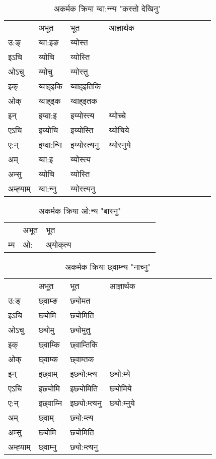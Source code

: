 \begin{table}[H]
\label{ot.vi} \centering
\caption{अकर्मक क्रिया  य्वा:न्‍न्य  "कस्तो देखिनु"  }
\begin{tabular}{l|l|l|l|l|l|l|l|l|l|l|l|l}  \toprule
&अभूत & भूत & आज्ञार्थक \\ 
उ:ङ्‌ &य्वा:इङ &य्योस्त \\ 
इऽचि &य्योचि &य्योस्ति   \\ 
ओऽचु &य्योचु &य्योस्तु   \\ 
इक् &य्वाह्इकि &य्वाह्इतिकि   \\ 
ओक् &य्वाह्इक &य्वाह्इतक   \\ 
इन् & इय्वा:इ & इय्योस्त्य &य्योच्‍चे  \\ 
एऽचि & इय्योचि & इय्योस्ति &य्योचिये    \\ 
ए:न् & इय्वा:न्‍नि  & इय्योस्त्यनु &य्योस्‍नुये  \\ 
अम् & य्वा:इ & य्योस्त्य   \\ 
अम्सु & य्योचि & य्योस्ति   \\ 
अम्ह्‍याम् & य्वा:न्‍नु  & य्योस्त्यनु \\ 
\bottomrule
\end{tabular}
\end{table}


\begin{table}[H]
\label{ok.vi} \centering
\caption{अकर्मक क्रिया  ओ:न्य  "बास्नु"  }
\begin{tabular}{l|l|l|l|l|l|l|l|l|l|l|l|l}  \toprule
&अभूत & भूत   \\ 
म्य & ओ: & अ्योक्‌त्य   \\ 
\bottomrule
\end{tabular}
\end{table}


\begin{table}[H]
\label{om.vi} \centering
\caption{अकर्मक क्रिया  छ्वाम्‍न्य  "नाच्नु"  }
\begin{tabular}{l|l|l|l|l|l|l|l|l|l|l|l|l}  \toprule
&अभूत & भूत & आज्ञार्थक \\ 
उ:ङ्‌ &छ्वाम्ङ &छ्योमत \\ 
इऽचि &छ्योमि &छ्योमिति   \\ 
ओऽचु &छ्योमु &छ्योमुतु   \\ 
इक् &छ्वाम्कि &छ्वाम्तिकि   \\ 
ओक् &छ्वाम्क &छ्वाम्तक   \\ 
इन् & इछ्वाम् & इछ्यो:म्त्य &छ्यो:म्ये  \\ 
एऽचि & इछ्योमि & इछ्योमिति &छ्योमिये    \\ 
ए:न् & इछ्वाम्‍नि  & इछ्यो:म्त्यनु &छ्यो:म्‍नुये  \\ 
अम् & छ्वाम् & छ्यो:म्त्य   \\ 
अम्सु & छ्योमि & छ्योमिति   \\ 
अम्ह्‍याम् & छ्वाम्‍नु  & छ्यो:म्त्यनु \\ 
\bottomrule
\end{tabular}
\end{table}


